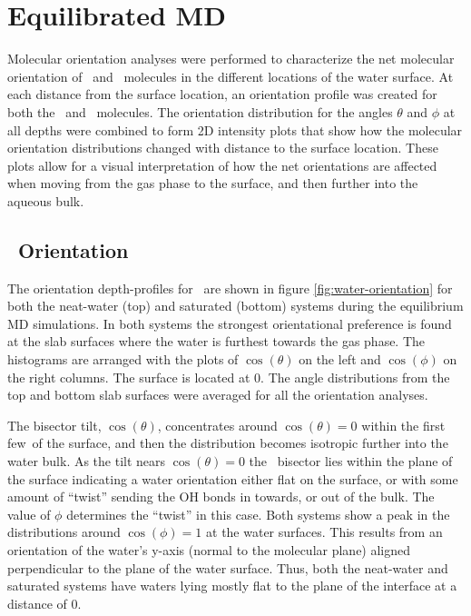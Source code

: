 \section{Equilibrated MD}

Molecular orientation analyses were performed to characterize the net molecular orientation of \wat~and \suldiox~molecules in the different locations of the water surface. At each distance from the surface location, an orientation profile was created for both the \wat~and \suldiox~molecules. The orientation distribution for the angles $\theta$ and $\phi$ at all depths were combined to form 2D intensity plots that show how the molecular orientation distributions changed with distance to the surface location. These plots allow for a visual interpretation of how the net orientations are affected when moving from the gas phase to the surface, and then further into the aqueous bulk.

\subsection{\wat~Orientation}

The orientation depth-profiles for \wat~are shown in figure \ref{fig:water-orientation} for both the neat-water (top) and saturated (bottom) systems during the equilibrium MD simulations. In both systems the strongest orientational preference is found at the slab surfaces where the water is furthest towards the gas phase. The histograms are arranged with the plots of $\cos(\theta)$ on the left and $\cos(\phi)$ on the right columns. The surface is located at 0\angs. The angle distributions from the top and bottom slab surfaces were averaged for all the orientation analyses.

The bisector tilt, $\cos(\theta)$, concentrates around $\cos(\theta)=0$ within the first few\angs~of the surface, and then the distribution becomes isotropic further into the water bulk. As the tilt nears $\cos(\theta)=0$ the \wat~bisector lies within the plane of the surface indicating a water orientation either flat on the surface, or with some amount of ``twist'' sending the OH bonds in towards, or out of the bulk. The value of $\phi$ determines the ``twist'' in this case. Both systems show a peak in the distributions around $\cos(\phi)=1$ at the water surfaces. This results from an orientation of the water's y-axis (normal to the molecular plane) aligned perpendicular to the plane of the water surface. Thus, both the neat-water and saturated systems have waters lying mostly flat to the plane of the interface at a distance of 0\angs.

